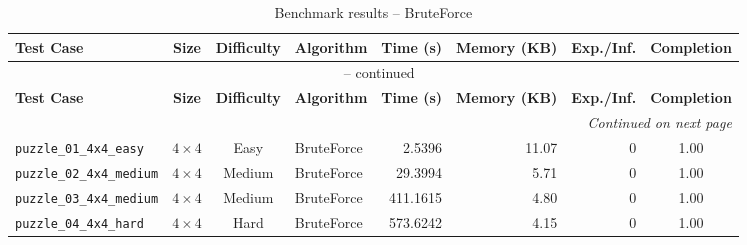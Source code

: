 \documentclass{article}
\begin{document}
\begin{longtable}{@{}lccl r r r c@{}}
  \caption{Benchmark results -- BruteForce} \label{tab:bruteforce} \\
  \toprule
  \textbf{Test Case} & \textbf{Size} & \textbf{Difficulty} & \textbf{Algorithm} & \textbf{Time (s)} & \textbf{Memory (KB)} & \textbf{Exp./Inf.} & \textbf{Completion} \\
  \midrule
  \endfirsthead
  \multicolumn{8}{c}{\tablename\ \thetable{} -- continued} \\
  \toprule
  \textbf{Test Case} & \textbf{Size} & \textbf{Difficulty} & \textbf{Algorithm} & \textbf{Time (s)} & \textbf{Memory (KB)} & \textbf{Exp./Inf.} & \textbf{Completion} \\
  \midrule
  \endhead
  \midrule
  \multicolumn{8}{r}{\textit{Continued on next page}} \\
  \endfoot
  \bottomrule
  \endlastfoot
  \texttt{puzzle\_01\_4x4\_easy} & $4\times4$ & Easy & BruteForce & 2.5396 & 11.07 & 0 & 1.00 \\
  \texttt{puzzle\_02\_4x4\_medium} & $4\times4$ & Medium & BruteForce & 29.3994 & 5.71 & 0 & 1.00 \\
  \texttt{puzzle\_03\_4x4\_medium} & $4\times4$ & Medium & BruteForce & 411.1615 & 4.80 & 0 & 1.00 \\
  \texttt{puzzle\_04\_4x4\_hard} & $4\times4$ & Hard & BruteForce & 573.6242 & 4.15 & 0 & 1.00 \\
\end{longtable}
\end{document}
